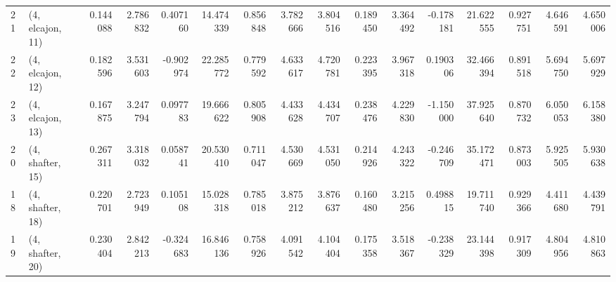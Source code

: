 \begin{tabular}{llrrrrrrrrrrrrrr}
21 &  (4, elcajon, 11) &   0.144088 &  2.786832 &  0.407160 &  14.474339 &  0.856848 &   3.782666 &  3.804516 &  0.189450 &   3.364492 & -0.178181 &   21.622555 &  0.927751 &   4.646591 &   4.650006 \\
22 &  (4, elcajon, 12) &   0.182596 &  3.531603 & -0.902974 &  22.285772 &  0.779592 &   4.633617 &  4.720781 &  0.223395 &   3.967318 &  0.190306 &   32.466394 &  0.891518 &   5.694750 &   5.697929 \\
23 &  (4, elcajon, 13) &   0.167875 &  3.247794 &  0.097783 &  19.666622 &  0.805908 &   4.433628 &  4.434707 &  0.238476 &   4.229830 & -1.150000 &   37.925640 &  0.870732 &   6.050053 &   6.158380 \\
20 &  (4, shafter, 15) &   0.267311 &  3.318032 &  0.058741 &  20.530410 &  0.711047 &   4.530669 &  4.531050 &  0.214926 &   4.243322 & -0.246709 &   35.172471 &  0.873003 &   5.925505 &   5.930638 \\
18 &  (4, shafter, 18) &   0.220701 &  2.723949 &  0.105108 &  15.028318 &  0.785018 &   3.875212 &  3.876637 &  0.160480 &   3.215256 &  0.498815 &   19.711740 &  0.929366 &   4.411680 &   4.439791 \\
19 &  (4, shafter, 20) &   0.230404 &  2.842213 & -0.324683 &  16.846136 &  0.758926 &   4.091542 &  4.104404 &  0.175358 &   3.518367 & -0.238329 &   23.144398 &  0.917309 &   4.804956 &   4.810863 \\
\bottomrule
\end{tabular}
